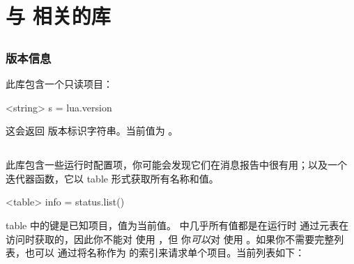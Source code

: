 

\chapter{与 \TEX 相关的库}\label{tex}

\section{}

\subsection{版本信息}



此库包含一个只读项目：

\begin{typing}
<string> s = lua.version
\end{typing}

这会返回 \LUA 版本标识字符串。当前值为
。

\section{}



此库包含一些运行时配置项，你可能会发现它们在消息报告中很有用；以及一个
迭代器函数，它以 table 形式获取所有名称和值。

\begin{typing}
<table> info = status.list()
\end{typing}

table 中的键是已知项目，值为当前值。 中几乎所有值都是在运行时
通过元表在访问时获取的，因此你不能对  使用 ，但
你{\it 可以}对  使用 。如果你不需要完整列表，也可以
通过将名称作为  的索引来请求单个项目。当前列表如下：

